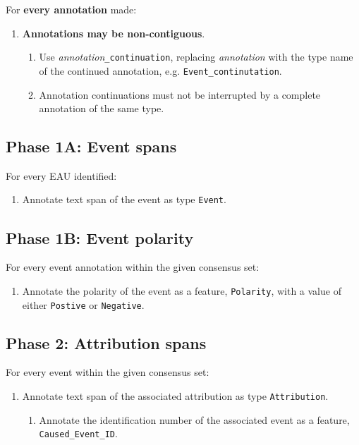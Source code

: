 \documentclass[a4paper,12pt]{article}
\begin{document}
    For \textbf{every annotation} made:
        \begin{enumerate}
            \item \textbf{Annotations may be non-contiguous}.
                \begin{enumerate}
                \item Use \emph{annotation}\texttt{\_continuation}, replacing \emph{annotation} with the type name of the continued annotation, e.g. \texttt{Event\_continutation}.
                \item Annotation continuations must not be interrupted by a complete annotation of the same type.
                \end{enumerate}
        \end{enumerate}

    \subsection{Phase 1A: Event spans}
    For every EAU identified:
        \begin{enumerate}
            \item Annotate text span of the event as type \texttt{Event}.
        \end{enumerate}

    \subsection{Phase 1B: Event polarity}
    For every event annotation within the given consensus set:
        \begin{enumerate}
            \item Annotate the polarity of the event as a feature, \texttt{Polarity}, with a value of either \texttt{Postive} or \texttt{Negative}.
        \end{enumerate}

    \subsection{Phase 2: Attribution spans}
    For every event within the given consensus set:
        \begin{enumerate}
            \item Annotate text span of the associated attribution as type \texttt{Attribution}.
                \begin{enumerate}
                    \item Annotate the identification number of the associated event as a feature, \texttt{Caused\_Event\_ID}.
                \end{enumerate}
        \end{enumerate}
\end{document}
